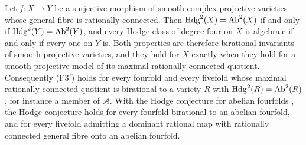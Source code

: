 \begin{proposition}
\label{prop:f3primefibration}
Let $f\colon X\to Y$ be a surjective morphism of smooth complex projective
varieties whose general fibre is rationally connected. Then
$\mathrm{Hdg}^{2}(X)=\mathrm{Ab}^{2}(X)$ if and only if
$\mathrm{Hdg}^{2}(Y)=\mathrm{Ab}^{2}(Y)$, and every Hodge class of degree four on $X$
is algebraic if and only if every one on $Y$ is. Both properties are
therefore birational invariants of smooth projective varieties, and they hold
for $X$ exactly when they hold for a smooth projective model of its maximal
rationally connected quotient. Consequently \textup{(F3$'$)} holds for every
fourfold and every fivefold whose maximal rationally connected quotient is
birational to a variety $R$ with $\mathrm{Hdg}^{2}(R)=\mathrm{Ab}^{2}(R)$, for
instance a member of $\mathcal{A}$. With the Hodge conjecture for abelian
fourfolds \cite{Mar25a,Mar25b}, the Hodge conjecture holds for every fourfold
birational to an abelian fourfold, and for every fivefold admitting a
dominant rational map with rationally connected general fibre onto an
abelian fourfold.
\end{proposition}

